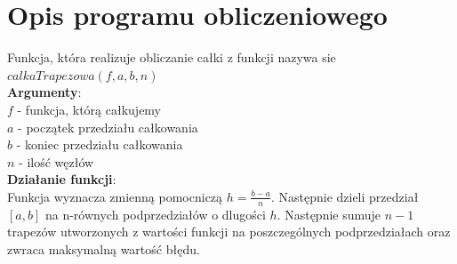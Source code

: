 \documentclass{article}\usepackage{amsmath,amsfonts,amssymb}
\begin{document}
\newpage
\section{Opis programu obliczeniowego}
Funkcja, która realizuje obliczanie całki z funkcji nazywa sie $calkaTrapezowa(f,a,b,n)$ \\
\textbf{Argumenty}: \\
$f$ - funkcja, którą całkujemy \\
$a$ - początek przedziału całkowania \\
$b$ - koniec przedziału całkowania  \\
$n$ - ilość węzłów \\
\textbf{Działanie funkcji}: \\
Funkcja wyznacza zmienną pomocniczą $h = \frac{b - a}{n}$. Następnie dzieli przedział $[a,b]$ na n-równych podprzedziałów  o dlugości $h$. Następnie sumuje $n - 1$ trapezów utworzonych z wartości funkcji na poszczególnych podprzedziałach oraz zwraca maksymalną wartość błędu.


\end{document}
